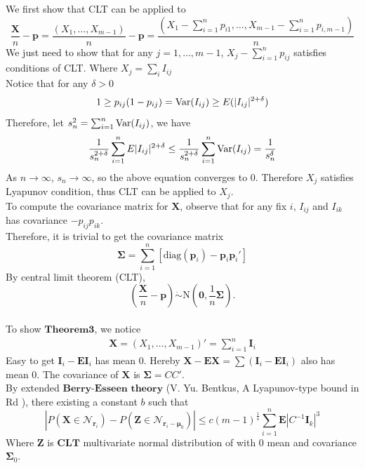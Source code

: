 \documentclass[12pt]{article}
\newcommand{\zerovec}{{\boldsymbol{0}}}
\newcommand{\EE}{\mathbf{E}}
\newcommand{\Var}{{\rm Var}}
\newcommand{\N}{\textrm{N}}
\newcommand{\diag}{\textrm{diag}}
\newcommand{\pvec}{\boldsymbol{p}}
\begin{document}
We first show that CLT can be applied to
\begin{equation*}
\frac{\boldsymbol{X}}{n} - \pvec = \frac{(X_1,\dots,X_{m-1})}{n} - \pvec = \frac{(X_1 - \sum_{i=1}^{n}p_{i1},\dots,X_{m-1} - \sum_{i=1}^{n}p_{i,m-1})}{n}
\end{equation*}
We just need to show that for any $j = 1,\dots,m-1$, $X_j - \sum_{i=1}^{n}p_{ij}$ satisfies conditions of CLT. Where $X_{j} = \sum_i I_{ij}$ \\
Notice that for any $\delta > 0$
\begin{equation*}
    1\geq p_{ij}(1-p_{ij}) = \Var (I_{ij}) \geq E(|I_{ij}|^{2+ \delta})
\end{equation*}
Therefore, let $s_n^2 = \sum_{i=1}^{n}\Var(I_{ij})$, we have
\begin{equation*}
    \frac{1}{s_n^{2+\delta}}\sum_{i=1}^{n}E|I_{ij}|^{2 + \delta} \leq  \frac{1}{s_n^{2+\delta}}\sum_{i=1}^{n}\Var(I_{ij}) = \frac{1}{s_n^\delta}
\end{equation*}
As $n \rightarrow \infty$, $s_n \rightarrow \infty$, so the above equation converges to 0. Therefore $X_j$ satisfies Lyapunov condition, thus CLT can be applied to $X_j$. \\
To compute the covariance matrix for $\boldsymbol{X}$,
observe that for any fix $i$, $I_{ij}$ and $I_{ik}$ has covariance $-p_{ij}p_{ik}$. \\


Therefore, it is trivial to get the covariance matrix $$\boldsymbol{\Sigma}=\sum_{i=1}^n[\diag(\pvec_i)-\pvec_i\pvec_i']$$
By central limit theorem (CLT),
$$\left(\frac{\boldsymbol{X}}{n}-\pvec\right)\dot\sim \N\left(\zerovec, \frac{1}{n}\boldsymbol{\Sigma}\right).$$\\

To show $\mathbf{Theorem 3}$, we notice
\begin{align*}
    \boldsymbol{X} = (X_1,\dots,X_{m-1})' = \sum_{i=1}^{n} \boldsymbol{I}_{i} 
\end{align*}
Easy to get $\boldsymbol{I}_i - \EE \boldsymbol{I}_i$ has mean 0. Hereby $\boldsymbol{X} - \EE \boldsymbol{X} = \sum (\boldsymbol{I}_i - \EE \boldsymbol{I}_i)$ also has mean 0. The covariance of $\boldsymbol{X}$ is $\boldsymbol{\Sigma} = CC'$.\\ 
By extended $\textbf{Berry-Esseen theory}$ (V. Yu. Bentkus, A Lyapunov-type bound in Rd
), there existing  a constant $b$ such that 
\begin{equation*}
    |P\left(\boldsymbol{X} \in \mathcal{N}_{\boldsymbol{r}_i}\right) - P\left(\boldsymbol{Z} \in \mathcal{N}_{\boldsymbol{r}_i-\boldsymbol{\mu}_0} \right)| \leq c(m-1)^{\frac{1}{4}}\sum_{i=1}^{n} \EE \left|C^{-1}\boldsymbol{I}_k\right|^3
\end{equation*}
Where $\boldsymbol{Z}$ is $\textbf{CLT}$ multivariate normal distribution of with 0 mean and covariance $\boldsymbol{\Sigma}_0$. 
\end{document}
